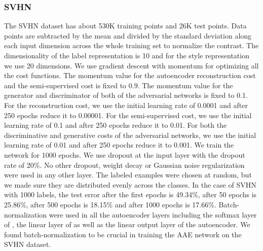 \documentclass{article}
\begin{document}
\begin{appendices}
\subsubsection{SVHN}
The SVHN dataset has about 530K training points and 26K test points. Data points are subtracted by the mean and divided by the standard deviation along each input dimension across the whole training set to normalize the contrast. The dimensionality of the label representation is 10 and for the style representation we use 20 dimensions. We use gradient descent with momentum for optimizing all the cost functions. The momentum value for the autoencoder reconstruction cost and the semi-supervised cost is fixed to 0.9. The momentum value for the generator and discriminator of both of the adversarial networks is fixed to 0.1. For the reconstruction cost, we use the initial learning rate of 0.0001 and after 250 epochs reduce it to 0.00001. For the semi-supervised cost, we use the initial learning rate of 0.1 and after 250 epochs reduce it to 0.01. For both the discriminative and generative costs of the adversarial networks, we use the initial learning rate of 0.01 and after 250 epochs reduce it to 0.001. We train the network for 1000 epochs. We use dropout at the input layer with the dropout rate of 20\%. No other dropout,  weight decay or Gaussian noise regularization were used in any other layer. The labeled examples were chosen at random, but we made sure they are distributed evenly across the classes. In the case of SVHN with 1000 labels, the test error after the first epochs is 49.34\%, after 50 epochs is 25.86\%, after 500 epochs is 18.15\% and after 1000 epochs is 17.66\%. Batch-normalization were used in all the autoencoder layers including the softmax layer of , the linear layer of  as well as the linear output layer of the autoencoder. We found batch-normalization \citep{batch} to be crucial in training the AAE network on the SVHN dataset.


\end{appendices}
\end{document}
